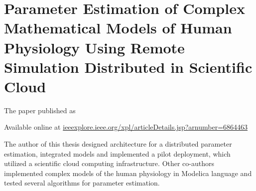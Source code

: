 \chapter{Parameter Estimation of Complex Mathematical Models of Human Physiology Using Remote Simulation Distributed in Scientific Cloud}\label{app:parameter}
The paper \cite{Kulhanek2014Parameters} published as
 

Available online at \href{http://ieeexplore.ieee.org/xpl/articleDetails.jsp?arnumber=6864463}{ieeexplore.ieee.org/xpl/articleDetails.jsp?arnumber=6864463}

The author of this thesis designed architecture for a distributed parameter estimation, integrated models and implemented a pilot deployment, which  utilized a scientific cloud computing infrastructure. Other co-authors implemented complex models of the human physiology in Modelica language and tested several algorithms for parameter estimation.


